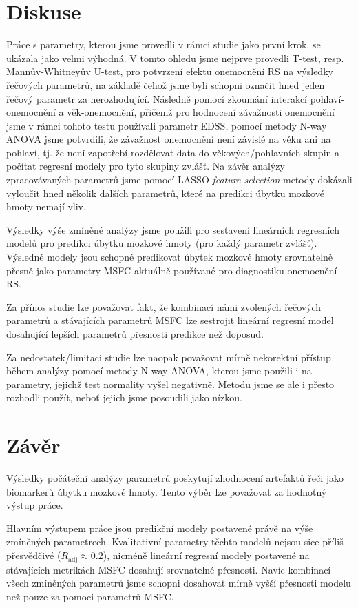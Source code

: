 \documentclass[11pt,a4paper]{article}
\begin{document}
    \section{Diskuse}
        Práce s parametry, kterou jsme provedli v rámci studie jako první krok, se ukázala jako velmi výhodná. V tomto ohledu jsme nejprve provedli T-test, resp. Mannův-Whitneyův U-test, pro potvrzení efektu onemocnění RS na výsledky řečových parametrů, na základě čehož jsme byli schopni označit hned jeden řečový parametr za nerozhodující. Následně pomocí zkoumání interakcí pohlaví-onemocnění a věk-onemocnění, přičemž pro hodnocení závažnosti onemocnění jsme v rámci tohoto testu používali parametr EDSS, pomocí metody N-way ANOVA jsme potvrdili, že závažnost onemocnění není závislé na věku ani na pohlaví, tj. že není zapotřebí rozdělovat data do věkových/pohlavních skupin a počítat regresní modely pro tyto skupiny zvlášť. Na závěr analýzy zpracovávaných parametrů jsme pomocí LASSO \emph{feature selection} metody dokázali vyloučit hned několik dalších parametrů, které na predikci úbytku mozkové hmoty nemají vliv.

        Výsledky výše zmíněné analýzy jsme použili pro sestavení lineárních regresních modelů pro predikci úbytku mozkové hmoty (pro každý parametr zvlášť). Výsledné modely jsou schopné predikovat úbytek mozkové hmoty srovnatelně přesně jako parametry MSFC aktuálně používané pro diagnostiku onemocnění RS.
        
        Za přínos studie lze považovat fakt, že kombinací námi zvolených řečových parametrů a stávajících parametrů MSFC lze sestrojit lineární regresní model dosahující lepších parametrů přesnosti predikce než doposud.

        Za nedostatek/limitaci studie lze naopak považovat mírně nekorektní přístup během analýzy pomocí metody N-way ANOVA, kterou jsme použili i na parametry, jejichž test normality vyšel negativně. Metodu jsme se ale i přesto rozhodli použít, neboť jejich  jsme posoudili jako nízkou.

    \section{Závěr}
        Výsledky počáteční analýzy parametrů poskytují zhodnocení artefaktů řeči jako biomarkerů úbytku mozkové hmoty. Tento výběr lze považovat za hodnotný výstup práce.
        
        Hlavním výstupem práce jsou predikční modely postavené právě na výše zmíněných parametrech. Kvalitativní parametry těchto modelů nejsou sice příliš přesvědčivé ($R_\mathrm{adj} \approx 0.2$), nicméně lineární regresní modely postavené na stávajících metrikách MSFC dosahují srovnatelné přesnosti. Navíc kombinací všech zmíněných parametrů jsme schopni dosahovat mírně vyšší přesnosti modelu než pouze za pomoci parametrů MSFC.
\newpage
\end{document}
